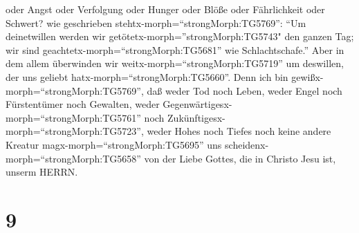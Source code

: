 oder Angst oder Verfolgung oder Hunger oder Blöße oder Fährlichkeit oder
Schwert?  wie geschrieben
stehtx-morph=``strongMorph:TG5769'': ``Um deinetwillen werden wir
getötetx-morph=''strongMorph:TG5743" den ganzen Tag; wir sind
geachtetx-morph=``strongMorph:TG5681'' wie Schlachtschafe.''
 Aber in dem allem überwinden wir
weitx-morph=``strongMorph:TG5719'' um deswillen, der uns geliebt
hatx-morph=``strongMorph:TG5660''.  Denn ich bin
gewißx-morph=``strongMorph:TG5769'', daß weder Tod noch Leben, weder
Engel noch Fürstentümer noch Gewalten, weder
Gegenwärtigesx-morph=``strongMorph:TG5761'' noch
Zukünftigesx-morph=``strongMorph:TG5723'',  weder Hohes
noch Tiefes noch keine andere Kreatur magx-morph=``strongMorph:TG5695''
uns scheidenx-morph=``strongMorph:TG5658'' von der Liebe Gottes, die in
Christo Jesu ist, unserm HERRN.

\hypertarget{section-8}{%
\section{9}\label{section-8}}

